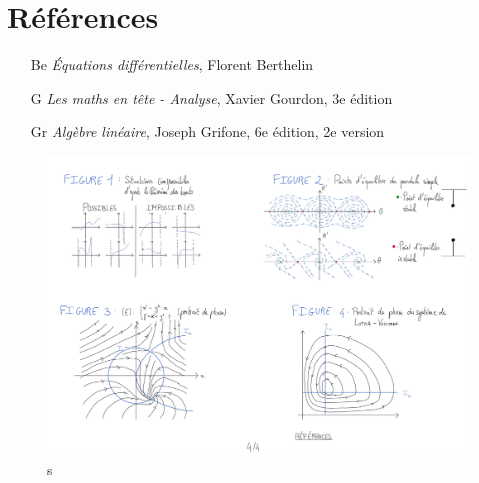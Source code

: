\documentclass[10pt, a4paper, parskip=full, twoside, twocolumn]{report}
\begin{document}
\section*{Références}
\begin{itemize}
	\item[Be] \emph{Équations différentielles}, Florent Berthelin
	\item[G] \emph{Les maths en tête - Analyse}, Xavier Gourdon, 3e édition 
	\item[Gr] \emph{Algèbre linéaire}, Joseph Grifone, 6e édition, 2e version

\end{itemize}

\begin{figure}[!htb]
	\centering
	\includegraphics[trim={0 0 0 0},clip,width=1\linewidth]{img/220.pdf}
	\caption{s}
\end{figure}
\end{document}
